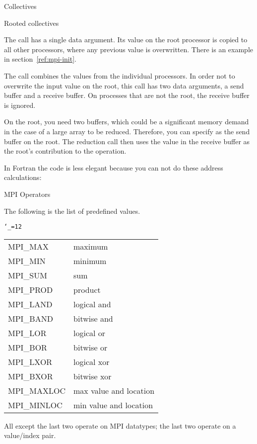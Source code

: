  {Collectives}

 {Rooted collectives}

The  call has a single data argument. Its
value on the root processor is copied to all other processors,
where any previous value is overwritten.
%
%
There is an example in section~\ref{ref:mpi-init}.

The  call combines the values from the individual
processors. In order not to overwrite the input value on the root, 
this call has two data arguments, a send buffer and a receive buffer.
%
%
On processes that are not the root, the receive buffer is ignored. 

On the root, 
you need two buffers, which could be a significant memory demand
in the case of a large array to be reduced.
Therefore, you can specify  as the send
buffer on the root. The reduction call then
uses the value in the receive buffer as the root's contribution to the operation.

In Fortran the code is less elegant because you can not do
these address calculations:

 {MPI Operators}

The following is the list of predefined  values.

\begingroup \tt\catcode`\_=12\relax
\begin{tabular}{ll}
  MPI_MAX&maximum\\
  MPI_MIN&minimum\\
  MPI_SUM&sum\\
  MPI_PROD&product\\
  MPI_LAND&logical and\\
  MPI_BAND&bitwise and\\
  MPI_LOR&logical or\\
  MPI_BOR&bitwise or\\
  MPI_LXOR&logical xor\\
  MPI_BXOR&bitwise xor\\
  MPI_MAXLOC&max value and location\\
  MPI_MINLOC&min value and location\\
\end{tabular}
\endgroup
All except the last two operate on MPI datatypes;
the last two operate on a value/index pair.

